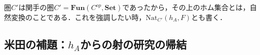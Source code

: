 \documentclass[uplatex, dvipdfmx]{jsreport}
\begin{document}
\begin{center}\end{center}
圏$C'$は関手の圏$C'=\mathbf{Fun}(C^{op},\mathbf{Set})$であったから，その上のホム集合とは，自然変換のことである．これを強調したい時，$\mathrm{Nat}_{C'}(h_A,F)$とも書く．

\subsection{米田の補題：$h_A$からの射の研究の帰結}
\end{document}
